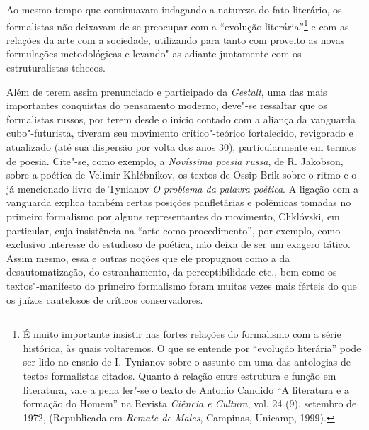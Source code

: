 {Ao mesmo tempo que continuavam indagando a natureza do fato literário,
os formalistas não deixavam de se preocupar com a ``evolução literária''\footnote{É muito importante insistir nas fortes relações do formalismo
  com a série histórica, às quais voltaremos. O que se entende por
  ``evolução literária'' pode ser lido no ensaio de I. Tynianov sobre o
  assunto em uma das antologias de testos formalistas citados. Quanto à
  relação entre estrutura e função em literatura, vale a pena ler"-se o
  texto de Antonio Candido ``A literatura e a formação do
  Homem'' na Revista \emph{Ciência e Cultura}, vol. 24 (9), setembro de
  1972, (Republicada em \emph{Remate de Males}, Campinas, Unicamp,
  1999).} e com as relações da arte com a sociedade, utilizando para
tanto com proveito as novas formulações metodológicas e levando"-as
adiante juntamente com os estruturalistas tchecos.

Além de terem assim prenunciado e participado da \emph{Gestalt}, uma das
mais importantes conquistas do pensamento moderno, deve"-se ressaltar que
os formalistas russos, por terem desde o início contado com a aliança da
vanguarda cubo"-futurista, tiveram seu movimento crítico"-teórico
fortalecido, revigorado e atualizado (até sua dispersão por volta dos
anos 30), particularmente em termos de poesia. Cite"-se, como exemplo, a
\emph{Novíssima poesia russa}, de R. Jakobson, sobre a poética de Velimir
Khlébnikov, os textos de Ossip Brik sobre o ritmo e o já mencionado
livro de Tynianov \emph{O problema da palavra poética}. A ligação com a
vanguarda explica também certas posições panfletárias e polêmicas
tomadas no primeiro formalismo por alguns representantes do movimento,
Chklóvski, em particular, cuja insistência na ``arte como
procedimento'', por exemplo, como exclusivo interesse do estudioso de
poética, não deixa de ser um exagero tático. Assim mesmo, essa e outras noções que ele propugnou como a
da desautomatização, do estranhamento, da perceptibilidade etc., bem
como os textos"-manifesto do primeiro formalismo foram muitas vezes mais
férteis do que os juízos cautelosos de críticos conservadores.

}
